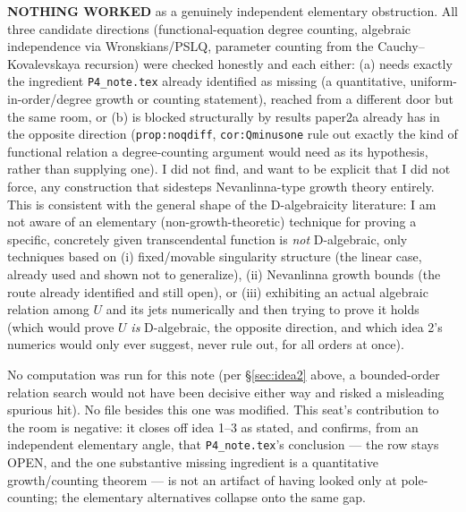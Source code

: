 \documentclass[11pt]{article}
\theoremstyle{remark}
\begin{document}
\textbf{NOTHING WORKED} as a genuinely independent elementary obstruction. All three candidate
directions (functional-equation degree counting, algebraic independence via Wronskians/PSLQ,
parameter counting from the Cauchy--Kovalevskaya recursion) were checked honestly and each either:
(a) needs exactly the ingredient \texttt{P4\_note.tex} already identified as missing (a quantitative,
uniform-in-order/degree growth or counting statement), reached from a different door but the same
room, or (b) is blocked structurally by results paper2a already has in the opposite direction
(\texttt{prop:noqdiff}, \texttt{cor:Qminusone} rule out exactly the kind of functional relation a
degree-counting argument would need as its hypothesis, rather than supplying one). I did not find,
and want to be explicit that I did not force, any construction that sidesteps Nevanlinna-type growth
theory entirely. This is consistent with the general shape of the D-algebraicity literature: I am not
aware of an elementary (non-growth-theoretic) technique for proving a specific, concretely given
transcendental function is \emph{not} D-algebraic, only techniques based on (i) fixed/movable
singularity structure (the linear case, already used and shown not to generalize), (ii) Nevanlinna
growth bounds (the route already identified and still open), or (iii) exhibiting an actual algebraic
relation among $U$ and its jets numerically and then trying to prove it holds (which would prove $U$
\emph{is} D-algebraic, the opposite direction, and which idea 2's numerics would only ever suggest,
never rule out, for all orders at once).

No computation was run for this note (per \S\ref{sec:idea2} above, a bounded-order relation search
would not have been decisive either way and risked a misleading spurious hit). No file besides this
one was modified. This seat's contribution to the room is negative: it closes off idea 1--3 as stated,
and confirms, from an independent elementary angle, that \texttt{P4\_note.tex}'s conclusion --- the
row stays OPEN, and the one substantive missing ingredient is a quantitative growth/counting theorem
--- is not an artifact of having looked only at pole-counting; the elementary alternatives collapse
onto the same gap.
\end{document}
